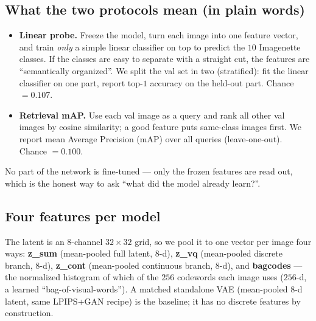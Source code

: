 \documentclass[11pt]{article}
\begin{document}
\subsection*{What the two protocols mean (in plain words)}
\begin{itemize}
  \item \textbf{Linear probe.} Freeze the model, turn each image into one feature vector, and
  train \emph{only} a simple linear classifier on top to predict the $10$ Imagenette classes.
  If the classes are easy to separate with a straight cut, the features are ``semantically
  organized''. We split the val set in two (stratified): fit the linear classifier on one part,
  report top-$1$ accuracy on the held-out part. Chance $=0.107$.
  \item \textbf{Retrieval mAP.} Use each val image as a query and rank all other val images by
  cosine similarity; a good feature puts same-class images first. We report mean Average
  Precision (mAP) over all queries (leave-one-out). Chance $=0.100$.
\end{itemize}
No part of the network is fine-tuned --- only the frozen features are read out, which is the
honest way to ask ``what did the model already learn?''.

\subsection*{Four features per model}
The latent is an $8$-channel $32\times32$ grid, so we pool it to one vector per image four ways:
\textbf{z\_sum} (mean-pooled full latent, $8$-d), \textbf{z\_vq} (mean-pooled discrete branch,
$8$-d), \textbf{z\_cont} (mean-pooled continuous branch, $8$-d), and \textbf{bagcodes} --- the
normalized histogram of which of the $256$ codewords each image uses ($256$-d, a learned
``bag-of-visual-words''). A matched standalone VAE (mean-pooled $8$-d latent, same LPIPS+GAN recipe)
is the baseline; it has no discrete features by construction.
\end{document}
